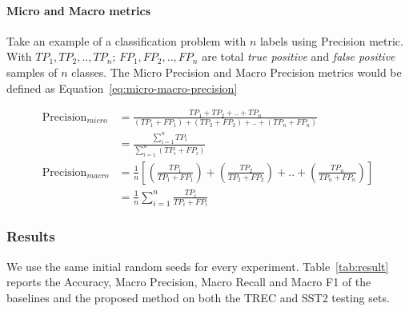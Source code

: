 \documentclass[sn-mathphys,Numbered]{sn-jnl}%
\theoremstyle{thmstyleone}%
\theoremstyle{thmstyletwo}%
\theoremstyle{thmstylethree}%
\begin{document}
\paragraph{Micro and Macro metrics}
Take an example of a classification problem with $n$ labels using Precision metric. With $TP_1, TP_2, .., TP_n$; $FP_1, FP_2, .., FP_n$ are total \textit{true positive} and \textit{false positive} samples of $n$ classes. The Micro Precision and Macro Precision metrics would be defined as Equation~\ref{eq:micro-macro-precision}

\begin{equation}\label{eq:micro-macro-precision}
\begin{aligned}
\text{Precision}_{micro} &= \frac{TP_1 + TP_2 + .. + TP_n}{(TP_1 + FP_1) + (TP_2 + FP_2) + .. + (TP_n + FP_n)} \\
&= \frac{\displaystyle\sum_{i = 1}^n TP_i}{\displaystyle\sum_{i = 1}^n (TP_i + FP_i)} \\
\text{Precision}_{macro} &= \frac{1}{n}\left[\left(\frac{TP_1}{TP_1 + FP_1}\right) + \left(\frac{TP_2}{TP_2 + FP_2}\right) + .. + \left(\frac{TP_n}{TP_n + FP_n}\right)\right] \\
&= \frac{1}{n}\sum_{i = 1}^n \frac{TP_i}{TP_i + FP_i}
\end{aligned}
\end{equation}

\subsubsection{Results}
We use the same initial random seeds for every experiment. Table~\ref{tab:result} reports the Accuracy, Macro Precision, Macro Recall and Macro F1 of the baselines and the proposed method on both the TREC and SST2 testing sets.
\end{document}
